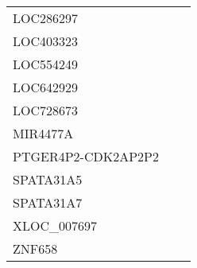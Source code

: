 \begin{tabular}{lcc}
LOC286297          &                &            \\
LOC403323          &                &            \\
LOC554249          &                &            \\
LOC642929          &                &            \\
LOC728673          &                &            \\
MIR4477A           &                &            \\
PTGER4P2-CDK2AP2P2 &                &            \\
SPATA31A5          &                &            \\
SPATA31A7          &                &            \\
XLOC\_007697        &                &            \\
ZNF658             &                &            \\
\bottomrule
\end{tabular}
